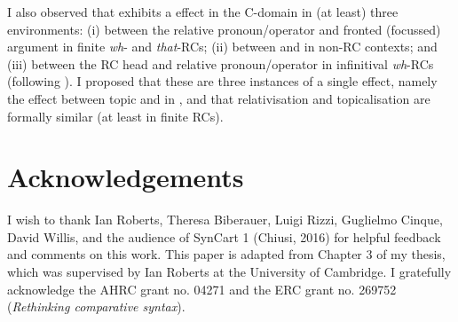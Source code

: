 \documentclass[output=paper]{langsci/langscibook}
\begin{document}
I also observed that  exhibits a  effect in the
C-domain in (at least) three environments: (i) between the relative
pronoun\slash operator and fronted (focussed) argument in finite \emph{wh}- and
\emph{that}-RCs; (ii) between  and  in non-RC contexts; and (iii)
between the \gls{RC} head and relative pronoun\slash operator in infinitival
\emph{wh}-\glspl{RC} (following \citealt{Richards2010}). I proposed that these are three
instances of a single effect, namely the  effect between
topic and  in , and that relativisation and topicalisation are
formally similar (at least in finite RCs).

\label{sec:abbreviations}

\printchapterglossary{}

\section*{Acknowledgements}

I wish to thank Ian Roberts, Theresa Biberauer, Luigi Rizzi, Guglielmo Cinque,
David Willis, and the audience of SynCart 1 (Chiusi, 2016) for helpful feedback
and comments on this work. This paper is adapted from Chapter 3 of my thesis,
which was supervised by Ian Roberts at the University of Cambridge. I
gratefully acknowledge the AHRC grant no. 04271 and the ERC grant no. 269752
(\emph{Rethinking comparative syntax}).

{\sloppy\printbibliography[heading=subbibliography,notkeyword=this]}
\end{document}
